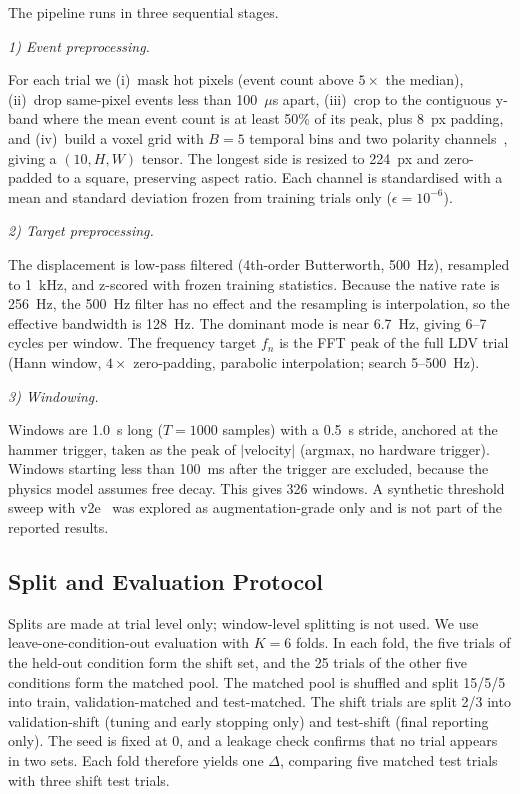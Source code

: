 \documentclass[conference]{IEEEtran}
\begin{document}
The pipeline runs in three sequential stages.

\noindent\textit{1) Event preprocessing.}

For each trial we (i)~mask hot pixels (event count above $5\times$ the median), (ii)~drop same-pixel events less than 100~$\mu$s apart, (iii)~crop to the contiguous y-band where the mean event count is at least 50\% of its peak, plus 8~px padding, and (iv)~build a voxel grid with $B = 5$ temporal bins and two polarity channels~\cite{Gallego2020}, giving a $(10, H, W)$ tensor. The longest side is resized to 224~px and zero-padded to a square, preserving aspect ratio. Each channel is standardised with a mean and standard deviation frozen from training trials only ($\epsilon = 10^{-6}$).

\noindent\textit{2) Target preprocessing.}

The displacement is low-pass filtered (4th-order Butterworth, 500~Hz), resampled to 1~kHz, and z-scored with frozen training statistics. Because the native rate is 256~Hz, the 500~Hz filter has no effect and the resampling is interpolation, so the effective bandwidth is 128~Hz. The dominant mode is near 6.7~Hz, giving 6--7 cycles per window. The frequency target $f_n$ is the FFT peak of the full LDV trial (Hann window, $4\times$ zero-padding, parabolic interpolation; search 5--500~Hz).

\noindent\textit{3) Windowing.}

Windows are 1.0~s long ($T = 1000$ samples) with a 0.5~s stride, anchored at the hammer trigger, taken as the peak of $|$velocity$|$ (argmax, no hardware trigger). Windows starting less than 100~ms after the trigger are excluded, because the physics model assumes free decay. This gives 326 windows. A synthetic threshold sweep with v2e~\cite{Hu2021} was explored as augmentation-grade only and is not part of the reported results.

\subsection{Split and Evaluation Protocol}
Splits are made at trial level only; window-level splitting is not used. We use leave-one-condition-out evaluation with $K = 6$ folds. In each fold, the five trials of the held-out condition form the shift set, and the 25 trials of the other five conditions form the matched pool. The matched pool is shuffled and split 15/5/5 into train, validation-matched and test-matched. The shift trials are split 2/3 into validation-shift (tuning and early stopping only) and test-shift (final reporting only). The seed is fixed at 0, and a leakage check confirms that no trial appears in two sets. Each fold therefore yields one $\Delta$, comparing five matched test trials with three shift test trials.
\end{document}

